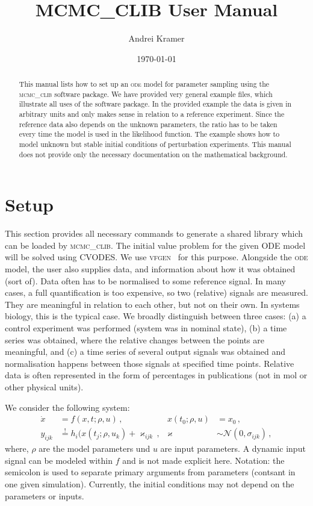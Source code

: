 \documentclass[english,12pt]{scrartcl}
\title{MCMC\_CLIB User Manual}
\author{Andrei Kramer}
\date{\today}
\newcommand{\CLIB}{\textsc{mcmc\_clib}}
\newcommand{\ode}{\textsc{ode}}
\newcommand{\noise}{\ensuremath{\varkappa}}
\begin{document}
\maketitle
\begin{abstract}
  This manual lists how to set up an \ode{} model for parameter
  sampling using the \CLIB{} software package. We have provided very
  general example files, which illustrate all uses of the software
  package. In the provided example the data is given in arbitrary
  units and only makes sense in relation to a reference
  experiment. Since the reference data also depends on the unknown
  parameters, the ratio has to be taken every time the model is used
  in the likelihood function. The example shows how to model unknown
  but stable initial conditions of perturbation experiments. This
  manual does not provide only the necessary documentation on the
  mathematical background.
\end{abstract}
\tableofcontents
\section{Setup}
\label{sec:setup}

This section provides all necessary commands to generate a shared
library which can be loaded by \CLIB{}. The initial value problem for
the given ODE model will be solved using CVODES. We use
\textsc{vfgen}~\cite{vfgen} for this purpose. Alongside the \ode{}
model, the user also supplies data, and information about how it was
obtained (sort of). Data often has to be normalised to some reference
signal. In many cases, a full quantification is too expensive, so two
(relative) signals are measured. They are meaningful in relation to
each other, but not on their own. In systems biology, this is the
typical case. We broadly distinguish between three cases: (a) a
control experiment was performed (system was in nominal state), (b) a
time series was obtained, where the relative changes between the
points are meaningful, and (c) a time series of several output signals
was obtained and normalisation happens between those signals at
specified time points. Relative data is often represented in the form
of percentages in publications (not in mol or other physical units). 

We consider the following system:
\begin{align}
  \dot x&=f(x,t;\rho,u)\,,& x(t_0;\rho,u)&=x_0\,,\label{eq:ode_model}\\
  y_{ijk}&\overset{!}{=} h_i(x(t_j;\rho,u_k) + \noise_{ijk}\,,& \noise &\sim \mathcal{N}(0,\sigma_{ijk})\,,
\end{align}
where, $\rho$ are the model parameters und $u$ are input parameters. A
dynamic input signal can be modeled within $f$ and is not made
explicit here. Notation: the semicolon is used to separate primary
arguments from parameters (contsant in one given simulation).
Currently, the initial conditions may not depend on the parameters or
inputs.
\end{document}

